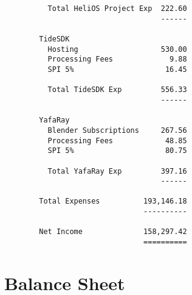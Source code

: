 \documentclass[letterpaper]{report}
\begin{document}
\begin{verbatim}
          Total HeliOS Project Exp  222.60
                                    ------

        TideSDK
          Hosting                   530.00
          Processing Fees             9.88
          SPI 5%                     16.45

          Total TideSDK Exp         556.33
                                    ------

        YafaRay
          Blender Subscriptions     267.56
          Processing Fees            48.85
          SPI 5%                     80.75

          Total YafaRay Exp         397.16
                                    ------

        Total Expenses          193,146.18
                                ----------

        Net Income              158,297.42
                                ==========

\end{verbatim}

\section{Balance Sheet}
\end{document}
